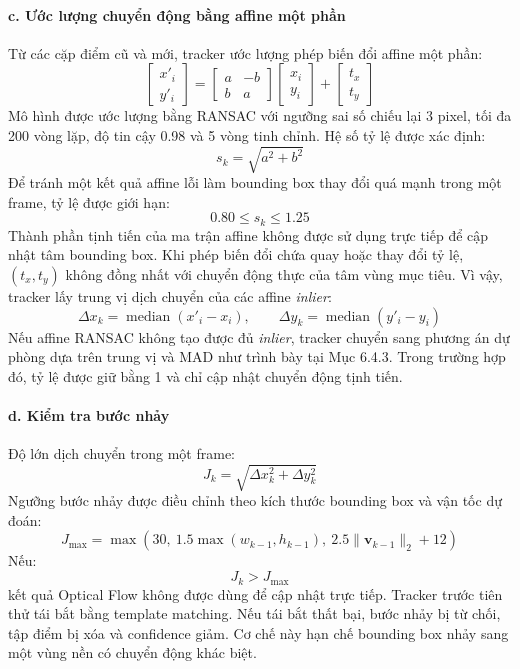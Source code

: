 \documentclass[../DoAn.tex]{subfiles}
\begin{document}
\paragraph{c. Ước lượng chuyển động bằng affine một phần}
Từ các cặp điểm cũ và mới, tracker ước lượng phép biến đổi affine một phần:
\[
\begin{bmatrix}
x'_i \\ y'_i
\end{bmatrix}
=
\begin{bmatrix}
a & -b \\
b & a
\end{bmatrix}
\begin{bmatrix}
x_i \\ y_i
\end{bmatrix}
+
\begin{bmatrix}
t_x \\ t_y
\end{bmatrix}
\]
Mô hình được ước lượng bằng RANSAC với ngưỡng sai số chiếu lại 3 pixel, tối đa 200 vòng lặp, độ tin cậy 0.98 và 5 vòng tinh chỉnh. Hệ số tỷ lệ được xác định:
\[
s_k = \sqrt{a^2 + b^2}
\]
Để tránh một kết quả affine lỗi làm bounding box thay đổi quá mạnh trong một frame, tỷ lệ được giới hạn:
\[
0.80 \leq s_k \leq 1.25
\]
Thành phần tịnh tiến của ma trận affine không được sử dụng trực tiếp để cập nhật tâm bounding box. Khi phép biến đổi chứa quay hoặc thay đổi tỷ lệ, $(t_x, t_y)$ không đồng nhất với chuyển động thực của tâm vùng mục tiêu. Vì vậy, tracker lấy trung vị dịch chuyển của các affine \textit{inlier}:
\[
\Delta x_k = \operatorname{median}\left(x'_{i} - x_i\right), \qquad \Delta y_k = \operatorname{median}\left(y'_{i} - y_i\right)
\]
Nếu affine RANSAC không tạo được đủ \textit{inlier}, tracker chuyển sang phương án dự phòng dựa trên trung vị và MAD như trình bày tại Mục 6.4.3. Trong trường hợp đó, tỷ lệ được giữ bằng 1 và chỉ cập nhật chuyển động tịnh tiến.

\paragraph{d. Kiểm tra bước nhảy}
Độ lớn dịch chuyển trong một frame:
\[
J_k = \sqrt{\Delta x_k^2 + \Delta y_k^2}
\]
Ngưỡng bước nhảy được điều chỉnh theo kích thước bounding box và vận tốc dự đoán:
\[
J_{\max} = \max\left(30,\ 1.5\max(w_{k-1}, h_{k-1}),\ 2.5\|\mathbf{v}_{k-1}\|_2 + 12\right)
\]
Nếu:
\[
J_k > J_{\max}
\]
kết quả Optical Flow không được dùng để cập nhật trực tiếp. Tracker trước tiên thử tái bắt bằng template matching. Nếu tái bắt thất bại, bước nhảy bị từ chối, tập điểm bị xóa và confidence giảm. Cơ chế này hạn chế bounding box nhảy sang một vùng nền có chuyển động khác biệt.
\end{document}
